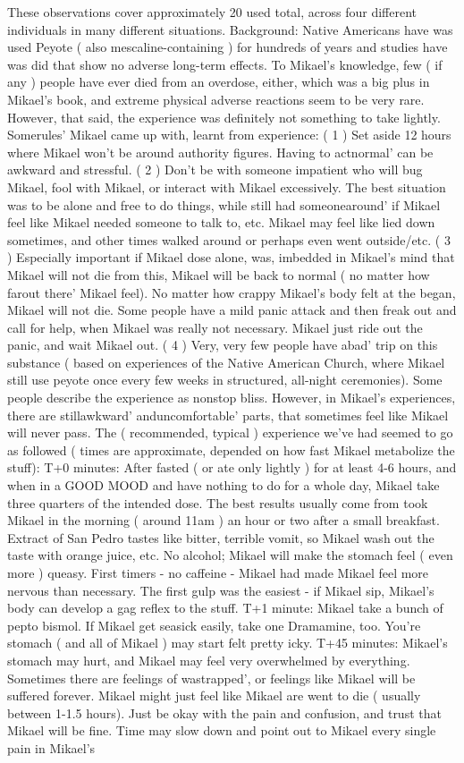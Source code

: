 \documentclass[12pt]{book}
\begin{document}
These observations cover approximately 20 used total, across four different individuals in many different situations. Background: Native Americans have was used Peyote ( also mescaline-containing ) for hundreds of years and studies have was did that show no adverse long-term effects. To Mikael's knowledge, few ( if any ) people have ever died from an overdose, either, which was a big plus in Mikael's book, and extreme physical adverse reactions seem to be very rare. However, that said, the experience was definitely not something to take lightly. Somerules' Mikael came up with, learnt from experience: ( 1 ) Set aside 12 hours where Mikael won't be around authority figures. Having to actnormal' can be awkward and stressful. ( 2 ) Don't be with someone impatient who will bug Mikael, fool with Mikael, or interact with Mikael excessively. The best situation was to be alone and free to do things, while still had someonearound' if Mikael feel like Mikael needed someone to talk to, etc. Mikael may feel like lied down sometimes, and other times walked around or perhaps even went outside/etc. ( 3 ) Especially important if Mikael dose alone, was, imbedded in Mikael's mind that Mikael will not die from this, Mikael will be back to normal ( no matter how farout there' Mikael feel). No matter how crappy Mikael's body felt at the began, Mikael will not die. Some people have a mild panic attack and then freak out and call for help, when Mikael was really not necessary. Mikael just ride out the panic, and wait Mikael out. ( 4 ) Very, very few people have abad' trip on this substance ( based on experiences of the Native American Church, where Mikael still use peyote once every few weeks in structured, all-night ceremonies). Some people describe the experience as nonstop bliss. However, in Mikael's experiences, there are stillawkward' anduncomfortable' parts, that sometimes feel like Mikael will never pass. The ( recommended, typical ) experience we've had seemed to go as followed ( times are approximate, depended on how fast Mikael metabolize the stuff): T+0 minutes: After fasted ( or ate only lightly ) for at least 4-6 hours, and when in a GOOD MOOD and have nothing to do for a whole day, Mikael take three quarters of the intended dose. The best results usually come from took Mikael in the morning ( around 11am ) an hour or two after a small breakfast. Extract of San Pedro tastes like bitter, terrible vomit, so Mikael wash out the taste with orange juice, etc. No alcohol; Mikael will make the stomach feel ( even more ) queasy. First timers - no caffeine - Mikael had made Mikael feel more nervous than necessary. The first gulp was the easiest - if Mikael sip, Mikael's body can develop a gag reflex to the stuff. T+1 minute: Mikael take a bunch of pepto bismol. If Mikael get seasick easily, take one Dramamine, too. You're stomach ( and all of Mikael ) may start felt pretty icky. T+45 minutes: Mikael's stomach may hurt, and Mikael may feel very overwhelmed by everything. Sometimes there are feelings of wastrapped', or feelings like Mikael will be suffered forever. Mikael might just feel like Mikael are went to die ( usually between 1-1.5 hours). Just be okay with the pain and confusion, and trust that Mikael will be fine. Time may slow down and point out to Mikael every single pain in Mikael's 
\end{document}
